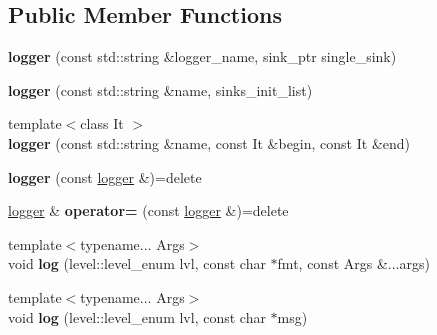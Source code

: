 \subsection*{Public Member Functions}
\begin{DoxyCompactItemize}
\item 
{\bfseries logger} (const std\+::string \&logger\+\_\+name, sink\+\_\+ptr single\+\_\+sink)\hypertarget{classspdlog_1_1logger_a01e952f5adbc10326c3d77b3ded7063b}{}\label{classspdlog_1_1logger_a01e952f5adbc10326c3d77b3ded7063b}

\item 
{\bfseries logger} (const std\+::string \&name, sinks\+\_\+init\+\_\+list)\hypertarget{classspdlog_1_1logger_a1c4b03a1b5d3a2305e19aee47f8f2c17}{}\label{classspdlog_1_1logger_a1c4b03a1b5d3a2305e19aee47f8f2c17}

\item 
{\footnotesize template$<$class It $>$ }\\{\bfseries logger} (const std\+::string \&name, const It \&begin, const It \&end)\hypertarget{classspdlog_1_1logger_add870b09f8a36ee6660cc0dc4eba258a}{}\label{classspdlog_1_1logger_add870b09f8a36ee6660cc0dc4eba258a}

\item 
{\bfseries logger} (const \hyperlink{classspdlog_1_1logger}{logger} \&)=delete\hypertarget{classspdlog_1_1logger_aa6074d763b0df4e7d16ccf7d307a3938}{}\label{classspdlog_1_1logger_aa6074d763b0df4e7d16ccf7d307a3938}

\item 
\hyperlink{classspdlog_1_1logger}{logger} \& {\bfseries operator=} (const \hyperlink{classspdlog_1_1logger}{logger} \&)=delete\hypertarget{classspdlog_1_1logger_afd373cd857f49de170d9a23f1dd34bc0}{}\label{classspdlog_1_1logger_afd373cd857f49de170d9a23f1dd34bc0}

\item 
{\footnotesize template$<$typename... Args$>$ }\\void {\bfseries log} (level\+::level\+\_\+enum lvl, const char $\ast$fmt, const Args \&...args)\hypertarget{classspdlog_1_1logger_a5149c7b8c1ac8aeedbeba779b0e0cfb7}{}\label{classspdlog_1_1logger_a5149c7b8c1ac8aeedbeba779b0e0cfb7}

\item 
{\footnotesize template$<$typename... Args$>$ }\\void {\bfseries log} (level\+::level\+\_\+enum lvl, const char $\ast$msg)\hypertarget{classspdlog_1_1logger_a44da1d3a0003e6a67fddb3d7bb99ce1d}{}\label{classspdlog_1_1logger_a44da1d3a0003e6a67fddb3d7bb99ce1d}


\end{DoxyCompactItemize}
